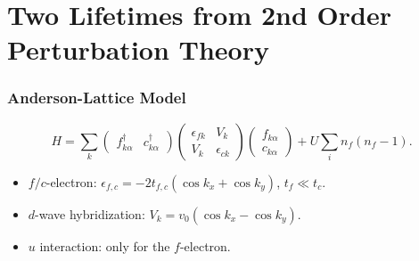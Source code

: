\documentclass[xcolor=table, 10pt, aspectratio=169]{beamer}
\begin{document}
\section{Two Lifetimes from 2nd Order Perturbation Theory}

\begin{frame}
\frametitle{Anderson-Lattice Model}
\[H=\sum_k\begin{pmatrix}f_{k\alpha}^\dagger&c_{k\alpha}^\dagger\end{pmatrix}
\begin{pmatrix}\epsilon_{fk} & V_k\\ V_k & \epsilon_{ck}\end{pmatrix}
\begin{pmatrix}f_{k\alpha}\\c_{k\alpha}\end{pmatrix}
+U\sum_in_f(n_f-1).\]
\begin{itemize}
\item $f/c$-electron: $\epsilon_{f,c}=-2t_{f,c}(\cos k_x+\cos k_y)$, $t_f\ll t_c$.
\item $d$-wave hybridization: $V_k=v_0(\cos k_x-\cos k_y)$.
\item $u$ interaction: only for the $f$-electron.
\end{itemize}
\end{frame}
\end{document}
